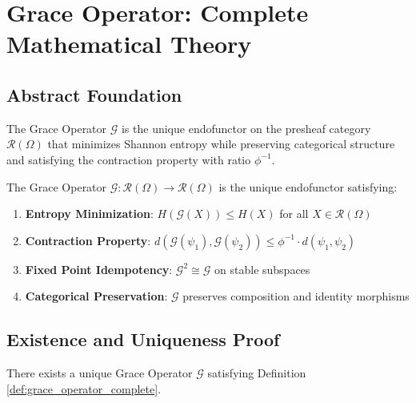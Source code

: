 \section{Grace Operator: Complete Mathematical Theory}

\subsection{Abstract Foundation}

The Grace Operator $\mathcal{G}$ is the unique endofunctor on the presheaf category $\mathcal{R}(\Omega)$ that minimizes Shannon entropy while preserving categorical structure and satisfying the contraction property with ratio $\phi^{-1}$.

\begin{definition}
\label{def:grace_operator_complete}
The Grace Operator $\mathcal{G}: \mathcal{R}(\Omega) \to \mathcal{R}(\Omega)$ is the unique endofunctor satisfying:
\begin{enumerate}
    \item \textbf{Entropy Minimization}: $H(\mathcal{G}(X)) \leq H(X)$ for all $X \in \mathcal{R}(\Omega)$
    \item \textbf{Contraction Property}: $d(\mathcal{G}(\psi_1), \mathcal{G}(\psi_2)) \leq \phi^{-1} \cdot d(\psi_1, \psi_2)$
    \item \textbf{Fixed Point Idempotency}: $\mathcal{G}^2 \cong \mathcal{G}$ on stable subspaces
    \item \textbf{Categorical Preservation}: $\mathcal{G}$ preserves composition and identity morphisms
\end{enumerate}
\end{definition}

\subsection{Existence and Uniqueness Proof}

\begin{theorem}
\label{thm:grace_existence_complete}
There exists a unique Grace Operator $\mathcal{G}$ satisfying Definition \ref{def:grace_operator_complete}.
\end{theorem}

